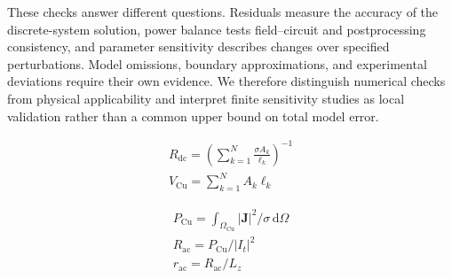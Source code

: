 \hypertarget{02.hierarchy.p3}{}
These checks answer different questions. Residuals measure the accuracy of the discrete-system solution, power balance tests field–circuit and postprocessing consistency, and parameter sensitivity describes changes over specified perturbations. Model omissions, boundary approximations, and experimental deviations require their own evidence. We therefore distinguish numerical checks from physical applicability and interpret finite sensitivity studies as local validation rather than a common upper bound on total model error.

\hypertarget{02.equation.E01}{}
\hypertarget{E01}{}
\begin{equation}
\begin{gathered}
R_{\mathrm{dc}}=\left(\sum_{k=1}^{N}\frac{\sigma A_k}{\ell_k}\right)^{-1} \\
V_{\mathrm{Cu}}=\sum_{k=1}^{N}A_k\ell_k
\end{gathered}
\tag{1}\label{eq:E01}
\end{equation}

\hypertarget{02.equation.E02}{}
\hypertarget{E02}{}
\begin{equation}
\begin{gathered}
P_{\mathrm{Cu}}=\int_{\Omega_{\mathrm{Cu}}}|\mathbf J|^2/\sigma\,\mathrm d\Omega \\
R_{\mathrm{ac}}=P_{\mathrm{Cu}}/|I_t|^2 \\
r_{\mathrm{ac}}=R_{\mathrm{ac}}/L_z
\end{gathered}
\tag{2}\label{eq:E02}
\end{equation}
